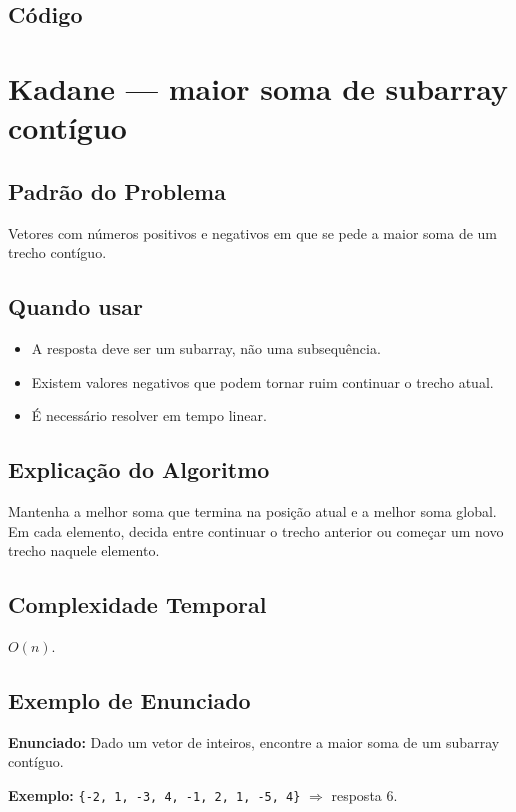 \subsection{Código}

\section{Kadane --- maior soma de subarray contíguo}

\subsection{Padrão do Problema}
Vetores com números positivos e negativos em que se pede a maior soma de um trecho contíguo.

\subsection{Quando usar}
\begin{itemize}[nosep]
  \item A resposta deve ser um subarray, não uma subsequência.
  \item Existem valores negativos que podem tornar ruim continuar o trecho atual.
  \item É necessário resolver em tempo linear.
\end{itemize}

\subsection{Explicação do Algoritmo}
Mantenha a melhor soma que termina na posição atual e a melhor soma global. Em cada elemento, decida entre continuar o trecho anterior ou começar um novo trecho naquele elemento.

\subsection{Complexidade Temporal}
$O(n)$.

\subsection{Exemplo de Enunciado}
\begin{exemplodiabox}
\textbf{Enunciado:} Dado um vetor de inteiros, encontre a maior soma de um subarray contíguo.

\textbf{Exemplo:} \texttt{\{-2, 1, -3, 4, -1, 2, 1, -5, 4\}} $\Rightarrow$ resposta $6$.
\end{exemplodiabox}

